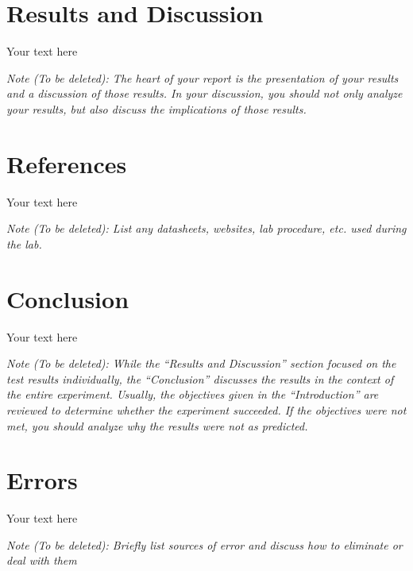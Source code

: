 \documentclass[10pt]{article}
\begin{document}
\section{Results and Discussion}

Your text here

\medskip

\textit{Note (To be deleted): The heart of your report is the presentation of your results and a discussion of those results. In your discussion, you should not only analyze your results, but also discuss the implications of those results.}

\section{References}

Your text here

\medskip

\textit{Note (To be deleted): List any datasheets, websites, lab procedure, etc. used during the lab.}

\section{Conclusion}

Your text here

\medskip

\textit{Note (To be deleted): While the ``Results and Discussion'' section focused on the test results individually, the ``Conclusion'' discusses the results in the context of the entire experiment. Usually, the objectives given in the ``Introduction'' are reviewed to determine whether the experiment succeeded. If the objectives were not met, you should analyze why the results were not as predicted.}

\section{Errors}

Your text here

\medskip

\textit{Note (To be deleted): Briefly list sources of error and discuss how to eliminate or deal with them}
\end{document}
